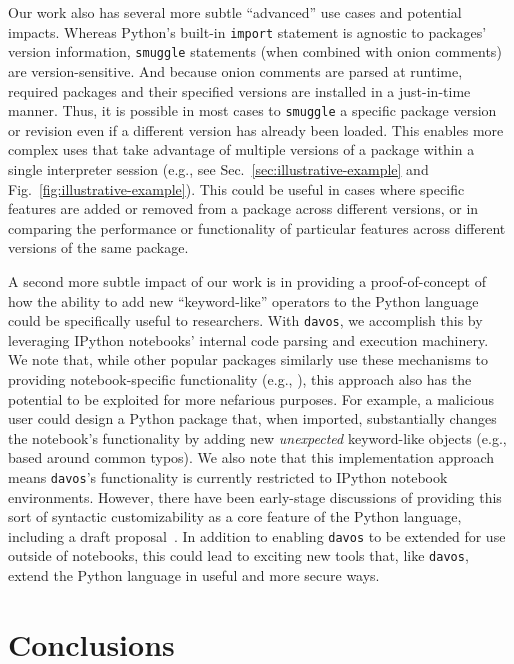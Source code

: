 \documentclass[preprint,12pt,a4paper]{elsarticle}
\begin{document}
Our work also has several more subtle ``advanced'' use cases and
potential impacts. Whereas Python's built-in \texttt{import} statement
is agnostic to packages' version information, \texttt{smuggle}
statements (when combined with onion comments) are version-sensitive.
And because onion comments are parsed at runtime, required packages
and their specified versions are installed in a just-in-time
manner. Thus, it is possible in most cases to \texttt{smuggle} a
specific package version or revision even if a different version has
already been loaded. This enables more complex uses that take
advantage of multiple versions of a package within a single
interpreter session (e.g., see
Sec.~\ref{sec:illustrative-example} and Fig.~\ref{fig:illustrative-example}). This could be useful in cases
where specific features are added or removed from a package across
different versions, or in comparing the performance or functionality
of particular features across different versions of the same package.

A second more subtle impact of our work is in providing a
proof-of-concept of how the ability to add new ``keyword-like''
operators to the Python language could be specifically useful to
researchers. With \texttt{davos}, we accomplish this by leveraging
IPython notebooks' internal code parsing and execution machinery. We
note that, while other popular packages similarly use these mechanisms
to providing notebook-specific functionality (e.g.,
\cite{Hunt07,HeusEtal18a}), this approach also has the potential to be
exploited for more nefarious purposes. For example, a malicious user
could design a Python package that, when imported, substantially
changes the notebook's functionality by adding new \textit{unexpected}
keyword-like objects (e.g., based around common typos). We also note
that this implementation approach means \texttt{davos}'s functionality
is currently restricted to IPython notebook environments. However,
there have been early-stage discussions of providing this sort of
syntactic customizability as a core feature of the Python language,
including a draft proposal~\cite{Shan20}. In addition to enabling
\texttt{davos} to be extended for use outside of notebooks, this could
lead to exciting new tools that, like \texttt{davos}, extend the
Python language in useful and more secure ways.


\section{Conclusions}
\end{document}

